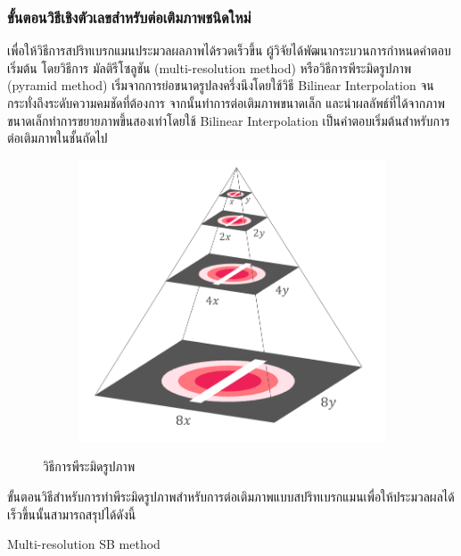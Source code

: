 \documentclass[hidelinks, a4paper,12pt]{article}
\numberwithin{equation}{section}							%
\numberwithin{equation}{section}
\begin{document}
{	\subsubsection{ขั้นตอนวิธีเชิงตัวเลขสำหรับต่อเติมภาพชนิดใหม่}
	\hspace{1cm} เพื่อให้วิธีการสปริทเบรกแมนประมวลผลภาพได้รวดเร็วขึ้น ผู้วิจัยได้พัฒนากระบวนการกำหนดคำตอบเริ่มต้น โดยวิธีการ มัลติรีโซลูชัน (multi-resolution method) หรือวิธีการพีระมิดรูปภาพ (pyramid method) \cite{ref:image-pyramid}
	เริ่มจากการย่อขนาดรูปลงครึ่งนึงโดยใช้วิธี Bilinear Interpolation จนกระทั่งถึงระดับความคมชัดที่ต้องการ จากนั้นทำการต่อเติมภาพขนาดเล็ก และนำผลลัพธ์ที่ได้จากภาพขนาดเล็กทำการขยายภาพขึ้นสองเท่าโดยใช้ Bilinear Interpolation เป็นคำตอบเริ่มต้นสำหรับการต่อเติมภาพในชั้นถัดไป
	 	\begin{figure}[H]
	 	\centering
	 	\begin{subfigure}{0.4\linewidth}
	 		\centering
	 		\includegraphics[width=0.8\linewidth]{images/image_inpaint_synthetic/image_pyramid.png}
	 	\end{subfigure}
 		 \caption{วิธีการพีระมิดรูปภาพ}
	 \end{figure}
 	\hspace{1cm} ขั้นตอนวิธีสำหรับการทำพีระมิดรูปภาพสำหรับการต่อเติมภาพแบบสปริทเบรกแมนเพื่อให้ประมวลผลได้เร็วขึ้นนั้นสามารถสรุปได้ดังนี้
	\begin{algorithm}[H]
		\label{algo:MultiSplitBregmanColorInpaint}
		\caption{Multi-resolution SB method}
		\SetAlgoNoLine
\end{algorithm}}
\end{document}
